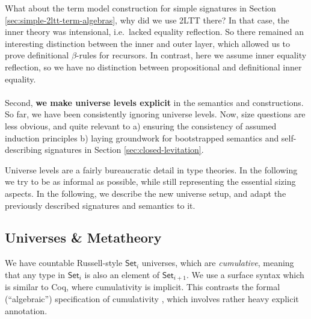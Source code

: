 \documentclass[12pt,a4paper,twoside,openany]{book}
\theoremstyle{remark}
\theoremstyle{definition}
\theoremstyle{theorem}
\newcommand{\Set}{\mathsf{Set}}
\begin{document}
What about the term model construction for simple signatures in Section
\ref{sec:simple-2ltt-term-algebras}, why did we use 2LTT there? In that case,
the inner theory was intensional, i.e.\ lacked equality reflection. So
there remained an interesting distinction between the inner and outer layer,
which allowed us to prove definitional $\beta$-rules for recursors. In
contrast, here we assume inner equality reflection, so we have no distinction
between propositional and definitional inner equality.
\\\\
\indent Second, \textbf{we make universe levels explicit} in the semantics and
constructions. So far, we have been consistently ignoring universe levels. Now,
size questions are less obvious, and quite relevant to a) ensuring the
consistency of assumed induction principles b) laying groundwork for
bootstrapped semantics and self-describing signatures in Section \ref{sec:closed-levitation}.

Universe levels are a fairly bureaucratic detail in type theories. In the
following we try to be as informal as possible, while still representing the
essential sizing aspects. In the following, we describe the new universe setup,
and adapt the previously described signatures and semantics to it.

\subsection{Universes \& Metatheory}
\label{sec:cumulative-ett}

We have countable Russell-style $\Set_i$ universes, which are \emph{cumulative},
meaning that any type in $\Set_i$ is also an element of $\Set_{i+1}$. We use a
surface syntax which is similar to Coq, where cumulativity is implicit. This
contrasts the formal (``algebraic'') specification of cumulativity
\cite{sterling2019algebraic,kovacs2021generalized}, which involves rather heavy
explicit annotation.
\end{document}
